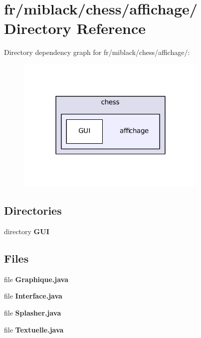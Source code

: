 \section{fr/miblack/chess/affichage/ Directory Reference}
\label{dir_cbe08a181fc913ef0d1e6c149c872214}
Directory dependency graph for fr/miblack/chess/affichage/\-:
\nopagebreak
\begin{figure}[H]
\begin{center}
\leavevmode
\includegraphics[width=260pt]{dir_cbe08a181fc913ef0d1e6c149c872214_dep}
\end{center}
\end{figure}
\subsection*{Directories}
\begin{DoxyCompactItemize}
\item 
directory {\bf G\-U\-I}
\end{DoxyCompactItemize}
\subsection*{Files}
\begin{DoxyCompactItemize}
\item 
file {\bf Graphique.\-java}
\item 
file {\bf Interface.\-java}
\item 
file {\bf Splasher.\-java}
\item 
file {\bf Textuelle.\-java}
\end{DoxyCompactItemize}
